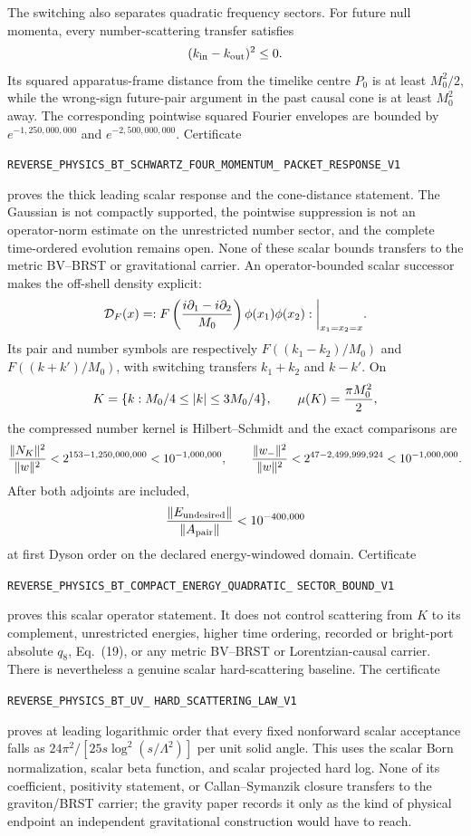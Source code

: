 \documentclass[11pt]{article}
\theoremstyle{definition}
\theoremstyle{remark}
\begin{document}
The switching also separates quadratic frequency sectors.  For future null
momenta, every number-scattering transfer satisfies
\[
 (k_{\rm in}-k_{\rm out})^2\leq0.
\]
Its squared apparatus-frame distance from the timelike centre $P_0$ is at
least $M_0^2/2$, while the wrong-sign future-pair argument in the past causal
cone is at least $M_0^2$ away.  The corresponding pointwise squared Fourier
envelopes are bounded by $e^{-1,250,000,000}$ and
$e^{-2,500,000,000}$.  Certificate
\par\noindent
\texttt{REVERSE\_PHYSICS\_BT\_SCHWARTZ\_FOUR\_MOMENTUM\_}
\allowbreak\texttt{PACKET\_RESPONSE\_V1}
\par\noindent
proves the thick leading scalar response and the cone-distance statement.
The Gaussian is not compactly supported, the pointwise suppression is not an
operator-norm estimate on the unrestricted number sector, and the complete
time-ordered evolution remains open.  None of these scalar bounds transfers
to the metric BV--BRST or gravitational carrier.
An operator-bounded scalar successor makes the off-shell density explicit:
\[
 {\cal D}_F(x)=:
 F\left({i\partial_1-i\partial_2\over M_0}\right)
 \phi(x_1)\phi(x_2):\bigg|_{x_1=x_2=x}.
\]
Its pair and number symbols are respectively
$F((k_1-k_2)/M_0)$ and $F((k+k')/M_0)$, with switching transfers
$k_1+k_2$ and $k-k'$.  On
\[
 K=\{k:M_0/4\leq|k|\leq3M_0/4\},
 \qquad\mu(K)={\pi M_0^2\over2},
\]
the compressed number kernel is Hilbert--Schmidt and the exact comparisons
are
\[
 {\|N_K\|^2\over\|w\|^2}<2^{153-1,250,000,000}<10^{-1,000,000},
 \qquad
 {\|w_-\|^2\over\|w\|^2}<2^{47-2,499,999,924}<10^{-1,000,000}.
\]
After both adjoints are included,
\[
 {\|E_{\rm undesired}\|\over\|A_{\rm pair}\|}<10^{-400,000}
\]
at first Dyson order on the declared energy-windowed domain.  Certificate
\par\noindent
\texttt{REVERSE\_PHYSICS\_BT\_COMPACT\_ENERGY\_QUADRATIC\_}
\allowbreak\texttt{SECTOR\_BOUND\_V1}
\par\noindent
proves this scalar operator statement.  It does not control scattering from
$K$ to its complement, unrestricted energies, higher time ordering,
recorded or bright-port absolute $q_8$, Eq.~(19), or any metric BV--BRST or
Lorentzian-causal carrier.
There is nevertheless a genuine scalar hard-scattering baseline.  The
certificate
\par\noindent
\texttt{REVERSE\_PHYSICS\_BT\_UV\_}
\allowbreak\texttt{HARD\_SCATTERING\_LAW\_V1}
\par\noindent
proves at leading logarithmic order that every fixed nonforward scalar
acceptance falls as $24\pi^2/[25s\log^2(s/\Lambda^2)]$ per unit solid angle.
This uses the scalar Born normalization, scalar beta function, and scalar
projected hard log.  None of its coefficient, positivity statement, or
Callan--Symanzik closure transfers to the graviton/BRST carrier; the gravity
paper records it only as the kind of physical endpoint an independent
gravitational construction would have to reach.
\end{document}
